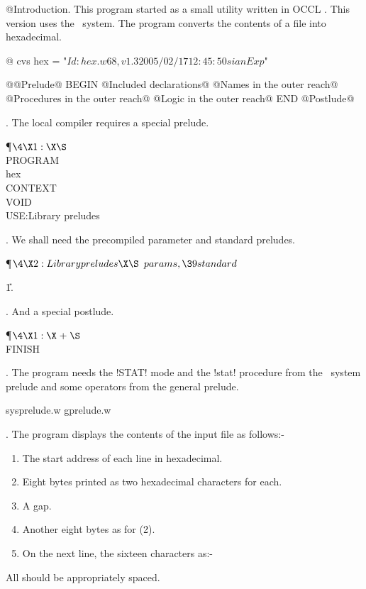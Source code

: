 
@Introduction.
This program started as a small utility written in OCCL \Algol. This
version uses the \Web\ system. The program converts the contents of
a file into hexadecimal.

@ cvs hex = "$Id: hex.w68,v 1.3 2005/02/17 12:45:50 sian Exp $"

@@Prelude@
BEGIN
@Included declarations@
@Names in the outer reach@
@Procedures in the outer reach@
@Logic in the outer reach@
END
@Postlude@


. The local compiler requires a special prelude.

\Y\P$\4\X1:\X\S$\6
\\{PROGRAM}\\{hex}\\{CONTEXT}\\{VOID}\\{USE}:Library preludes\X\par
\fi

. We shall need the precompiled parameter and standard preludes.

\Y\P$\4\X2:Library preludes\X\S$\6
$\\{params},\39\\{standard}$\par
\U1.\fi

. And a special postlude.

\Y\P$\4\X1:\X\mathrel{+}\S$\6
\\{FINISH}\par
\fi

. The program needs the !STAT! mode and the !stat! procedure from the
\Web\ system prelude and some operators from the general prelude.

sysprelude.w
gprelude.w

\fi

. The program displays the contents of the input file as follows:-
\begin{enumerate}
\item The start address of each line in hexadecimal.
\item Eight bytes printed as two hexadecimal characters for each.
\item A gap.
\item Another eight bytes as for (2).
\item On the next line, the sixteen characters as:-
\end{enumerate}
All should be appropriately spaced.

